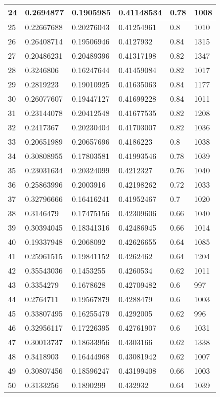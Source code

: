 \begin{longtable}{|l|l|l|l|l|l|}
24 & 0.2694877 & 0.1905985 & 0.41148534 & 0.78 & 1008 \\ \hline 
25 & 0.22667688 & 0.20276043 & 0.41254961 & 0.8 & 1010 \\ \hline 
26 & 0.26408714 & 0.19506946 & 0.4127932 & 0.84 & 1315 \\ \hline 
27 & 0.20486231 & 0.20489396 & 0.41317198 & 0.82 & 1347 \\ \hline 
28 & 0.3246806 & 0.16247644 & 0.41459084 & 0.82 & 1017 \\ \hline 
29 & 0.2819223 & 0.19010925 & 0.41635063 & 0.84 & 1177 \\ \hline 
30 & 0.26077607 & 0.19447127 & 0.41699228 & 0.84 & 1011 \\ \hline 
31 & 0.23144078 & 0.20412548 & 0.41677535 & 0.82 & 1208 \\ \hline 
32 & 0.2417367 & 0.20230404 & 0.41703007 & 0.82 & 1036 \\ \hline 
33 & 0.20651989 & 0.20657696 & 0.4186223 & 0.8 & 1038 \\ \hline 
34 & 0.30808955 & 0.17803581 & 0.41993546 & 0.78 & 1039 \\ \hline 
35 & 0.23031634 & 0.20324099 & 0.4212327 & 0.76 & 1040 \\ \hline 
36 & 0.25863996 & 0.2003916 & 0.42198262 & 0.72 & 1033 \\ \hline 
37 & 0.32796666 & 0.16416241 & 0.41952467 & 0.7 & 1020 \\ \hline 
38 & 0.3146479 & 0.17475156 & 0.42309606 & 0.66 & 1040 \\ \hline 
39 & 0.30394045 & 0.18341316 & 0.42486945 & 0.66 & 1014 \\ \hline 
40 & 0.19337948 & 0.2068092 & 0.42626655 & 0.64 & 1085 \\ \hline 
41 & 0.25961515 & 0.19841152 & 0.4262462 & 0.64 & 1204 \\ \hline 
42 & 0.35543036 & 0.1453255 & 0.4260534 & 0.62 & 1011 \\ \hline 
43 & 0.3354279 & 0.1678628 & 0.42709482 & 0.6 & 997 \\ \hline 
44 & 0.2764711 & 0.19567879 & 0.4288479 & 0.6 & 1003 \\ \hline 
45 & 0.33807495 & 0.16255479 & 0.4292005 & 0.62 & 996 \\ \hline 
46 & 0.32956117 & 0.17226395 & 0.42761907 & 0.6 & 1031 \\ \hline 
47 & 0.30013737 & 0.18633956 & 0.4303166 & 0.62 & 1338 \\ \hline 
48 & 0.3418903 & 0.16444968 & 0.43081942 & 0.62 & 1007 \\ \hline 
49 & 0.30807456 & 0.18596247 & 0.43199408 & 0.66 & 1003 \\ \hline 
50 & 0.3133256 & 0.1890299 & 0.432932 & 0.64 & 1039 \\ \hline 
\end{longtable}